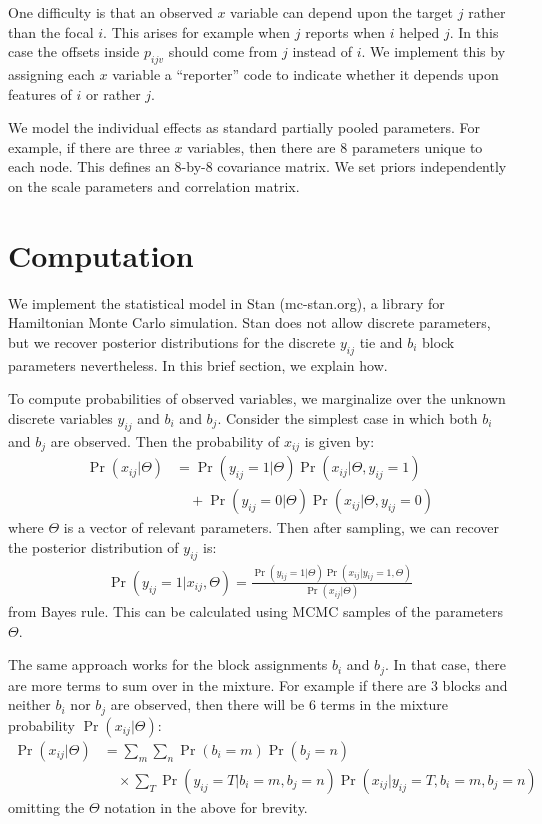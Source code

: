 \documentclass[reqno,12pt,a4paper]{amsart}
\begin{document}
One difficulty is that an observed $x$ variable can depend upon the target $j$ rather than the focal $i$. This arises for example when $j$ reports when $i$ helped $j$. In this case the offsets inside $p_{ijv}$ should come from $j$ instead of $i$. We implement this by assigning each $x$ variable a ``reporter'' code to indicate whether it depends upon features of $i$ or rather $j$.

We model the individual effects as standard partially pooled parameters. For example, if there are three $x$ variables, then there are 8 parameters unique to each node. This defines an 8-by-8 covariance matrix. We set priors independently on the scale parameters and correlation matrix.



\section{Computation}

We implement the statistical model in Stan (mc-stan.org), a library for Hamiltonian Monte Carlo simulation. Stan does not allow discrete parameters, but we recover posterior distributions for the discrete $y_{ij}$ tie and $b_i$ block parameters nevertheless. In this brief section, we explain how.

To compute probabilities of observed variables, we marginalize over the unknown discrete variables $y_{ij}$ and $b_i$ and $b_j$. Consider the simplest case in which both $b_i$ and $b_j$ are observed. Then the probability of $x_{ij}$ is given by:
\begin{align*}
	\Pr(x_{ij}|\Theta) &= \Pr(y_{ij}=1|\Theta)\Pr(x_{ij}|\Theta,y_{ij}=1) \\
	&\quad + \Pr(y_{ij}=0|\Theta)\Pr(x_{ij}|\Theta,y_{ij}=0)
\end{align*}
where $\Theta$ is a vector of relevant parameters. Then after sampling, we can recover the posterior distribution of $y_{ij}$ is:
\begin{align*}
	\Pr(y_{ij}=1|x_{ij},\Theta) = \frac{\Pr(y_{ij}=1|\Theta)\Pr(x_{ij}|y_{ij}=1,\Theta)}{\Pr(x_{ij}|\Theta)}
\end{align*}
from Bayes rule. This can be calculated using MCMC samples of the parameters $\Theta$.

The same approach works for the block assignments $b_i$ and $b_j$. In that case, there are more terms to sum over in the mixture. For example if there are 3 blocks and neither $b_i$ nor $b_j$ are observed, then there will be 6 terms in the mixture probability $\Pr(x_{ij}|\Theta)$:
\begin{align*}
	\Pr(x_{ij}|\Theta) &=  \sum_m \sum_n \Pr(b_i=m) \Pr(b_j=n) \\
	& \quad \times \sum_T \Pr(y_{ij}=T|b_i=m,b_j=n)   \Pr(x_{ij}|y_{ij}=T,b_i=m,b_j=n)
\end{align*}
omitting the $\Theta$ notation in the above for brevity. 
\end{document}
